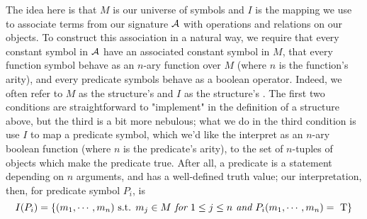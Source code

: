 \documentclass{article}
\begin{document}
\n
The idea here is that $ M $ is our universe of symbols and $ I $ is the mapping we use to associate terms from our signature $ \mathcal{A} $ with operations and relations on our objects. To construct this association in a natural way, we require that every constant symbol in $ \mathcal{A} $ have an associated constant symbol in $ M $, that every function symbol behave as an $ n $-ary function over $ M $ (where $ n $ is the function's arity), and every predicate symbols behave as a boolean operator. Indeed, we often refer to $ M $ as the structure's  and $ I $ as the structure's .
\nn
The first two conditions are straightforward to "implement" in the definition of a structure above, but the third is a bit more nebulous; what we do in the third condition is use $ I $ to map a predicate symbol, which we'd like the interpret as an $ n $-ary boolean function (where $ n $ is the predicate's arity), to the set of $ n $-tuples of objects which make the predicate true. After all, a predicate is a statement depending on $ n $  arguments, and has a well-defined truth value; our interpretation, then, for predicate symbol $ P_i $, is
    $$ I(P_i) = \{ (m_1, \cdots, m_n) \textnormal{ s.t. } m_j \in M \textit{ for } 1 \leq j \leq n \textit{ and } P_i(m_1, \cdots, m_n) = \text{\normalfont\ T} \} $$
\end{document}
